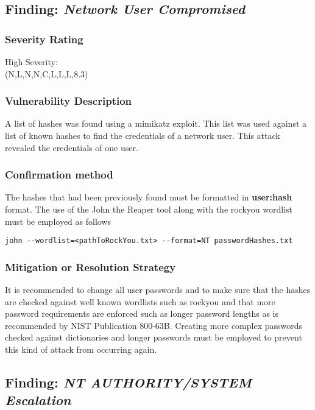 \documentclass[notitlepage]{article}
\begin{document}

  \subsection{Finding: \emph{Network User Compromised}}
	\subsubsection*{Severity Rating}
	High Severity: \\
    \cvss(N,L,N,N,C,L,L,L,8.3)
		
  	\subsubsection*{Vulnerability Description}
  		A list of hashes was found using a mimikatz exploit. This list was used against
        a list of known hashes to find the credentials of a network user. This attack revealed
        the credentials of one user. 

  	\subsubsection*{Confirmation method}
  	The hashes that had been previously found must be formatted in \textbf{user:hash} format. The use
    of the John the Reaper tool along with the rockyou wordlist must be employed as follows
    \begin{verbatim}
john --wordlist=<pathToRockYou.txt> --format=NT passwordHashes.txt
    \end{verbatim}
    
    \subsubsection*{Mitigation or Resolution Strategy}
    It is recommended to change all user passwords and to make sure that the hashes are checked against
    well known wordlists such as rockyou and that more password requirements are enforced such as longer password
    lengths as is recommended by NIST Publication 800-63B. Creating more complex passwords checked against
    dictionaries and longer passwords must be employed to prevent this kind of attack from occurring again.






  \subsection{Finding: \emph{NT AUTHORITY/SYSTEM Escalation}}
  
\end{document}
